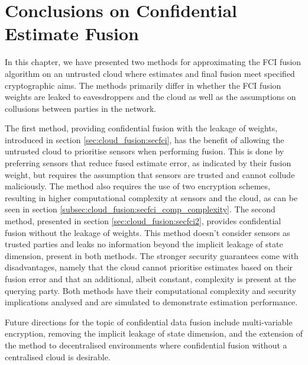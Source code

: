 % 
%                                               
%                                               
%                                               
% 

\section{Conclusions on Confidential Estimate Fusion}\label{sec:cloud_fusion:conclusion}
In this chapter, we have presented two methods for approximating the FCI fusion algorithm on an untrusted cloud where estimates and final fusion meet specified cryptographic aims. The methods primarily differ in whether the FCI fusion weights are leaked to eavesdroppers and the cloud as well as the assumptions on collusions between parties in the network.

The first method, providing confidential fusion with the leakage of weights, introduced in section \ref{sec:cloud_fusion:secfci}, has the benefit of allowing the untrusted cloud to prioritise sensors when performing fusion. This is done by preferring sensors that reduce fused estimate error, as indicated by their fusion weight, but requires the assumption that sensors are trusted and cannot collude maliciously. The method also requires the use of two encryption schemes, resulting in higher computational complexity at sensors and the cloud, as can be seen in section \ref{subsec:cloud_fusion:secfci_comp_complexity}. The second method, presented in section \ref{sec:cloud_fusion:secfci2}, provides confidential fusion without the leakage of weights. This method doesn't consider sensors as trusted parties and leaks no information beyond the implicit leakage of state dimension, present in both methods. The stronger security guarantees come with disadvantages, namely that the cloud cannot prioritise estimates based on their fusion error and that an additional, albeit constant, complexity is present at the querying party. Both methods have their computational complexity and security implications analysed and are simulated to demonstrate estimation performance.

Future directions for the topic of confidential data fusion include multi-variable encryption, removing the implicit leakage of state dimension, and the extension of the method to decentralised environments where confidential fusion without a centralised cloud is desirable.
